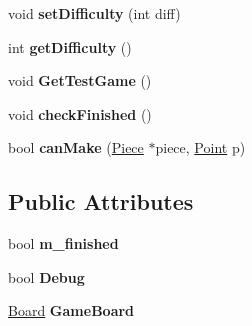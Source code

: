 \begin{DoxyCompactItemize}
\item 
\hypertarget{class_game_ae8ac0005c039f0f5f2dd1c10a299fe8d}{void {\bfseries set\-Difficulty} (int diff)}\label{class_game_ae8ac0005c039f0f5f2dd1c10a299fe8d}

\item 
\hypertarget{class_game_a2c0efe888e453a7fc0e644503fbd6316}{int {\bfseries get\-Difficulty} ()}\label{class_game_a2c0efe888e453a7fc0e644503fbd6316}

\item 
\hypertarget{class_game_a1f47238d93728540edb7940a80a9db89}{void {\bfseries Get\-Test\-Game} ()}\label{class_game_a1f47238d93728540edb7940a80a9db89}

\item 
\hypertarget{class_game_ae5be70ea28f2ec151cd93e86086f23a9}{void {\bfseries check\-Finished} ()}\label{class_game_ae5be70ea28f2ec151cd93e86086f23a9}

\item 
\hypertarget{class_game_a37edad1c1ded84b1735653f809ccb585}{bool {\bfseries can\-Make} (\hyperlink{class_piece}{Piece} $\ast$piece, \hyperlink{struct_point}{Point} p)}\label{class_game_a37edad1c1ded84b1735653f809ccb585}

\end{DoxyCompactItemize}
\subsection*{Public Attributes}
\begin{DoxyCompactItemize}
\item 
\hypertarget{class_game_aee0b70deb19422d35b2061beb339bdf8}{bool {\bfseries m\-\_\-finished}}\label{class_game_aee0b70deb19422d35b2061beb339bdf8}

\item 
\hypertarget{class_game_ad79740c2d2fa299cf322bf6ea322d9aa}{bool {\bfseries Debug}}\label{class_game_ad79740c2d2fa299cf322bf6ea322d9aa}

\item 
\hypertarget{class_game_aeb67bc4fc06221330cfd7c862c85b66d}{\hyperlink{class_board}{Board} {\bfseries Game\-Board}}\label{class_game_aeb67bc4fc06221330cfd7c862c85b66d}

\end{DoxyCompactItemize}
